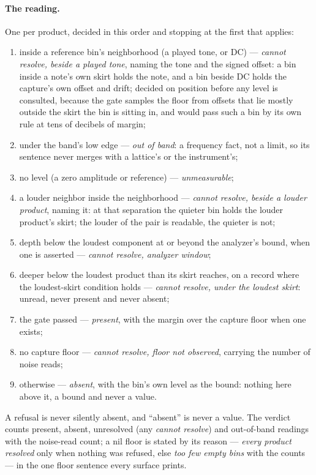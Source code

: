 \documentclass[11pt,a4paper]{article}
\begin{document}
\paragraph{The reading.}
\label{sec:imd-reading}
One  per product, decided in this order and stopping
at the first that applies:
\begin{enumerate}
  \item inside a reference bin's neighborhood (a played tone, or DC) ---
  \emph{cannot resolve, beside a played tone}, naming the tone and the
  signed offset: a bin inside a note's own skirt holds the note, and a
  bin beside DC holds the capture's own offset and drift; decided on
  position before any level is consulted, because the gate samples the
  floor from offsets that lie mostly outside the skirt the bin is sitting
  in, and would pass such a bin by its own rule at tens of decibels of margin;
  \item under the band's low edge --- \emph{out of band}: a frequency fact,
  not a limit, so its sentence never merges with a lattice's or the
  instrument's;
  \item no level (a zero amplitude or reference) --- \emph{unmeasurable};
  \item a louder neighbor inside the neighborhood --- \emph{cannot
  resolve, beside a louder product}, naming it: at that separation the
  quieter bin holds the louder product's skirt; the louder of the pair is
  readable, the quieter is not;
  \item depth below the loudest component at or beyond the analyzer's
  bound, when one is asserted --- \emph{cannot resolve, analyzer window};
  \item deeper below the loudest product than its skirt reaches, on a
  record where the loudest-skirt condition holds --- \emph{cannot resolve,
  under the loudest skirt}: unread, never present and never absent;
  \item the gate passed --- \emph{present}, with the margin over the capture
  floor when one exists;
  \item no capture floor --- \emph{cannot resolve, floor not observed},
  carrying the number of noise reads;
  \item otherwise --- \emph{absent}, with the bin's own level as the
  bound: nothing here above it, a bound and never a value.
\end{enumerate}
A refusal is never silently absent, and ``absent'' is never a value. The
verdict counts present, absent, unresolved (any \emph{cannot resolve}) and
out-of-band readings with the noise-read count; a nil floor is stated by
its reason --- \emph{every product resolved} only when nothing was refused,
else \emph{too few empty bins} with the counts --- in the one floor
sentence every surface prints.
\end{document}
